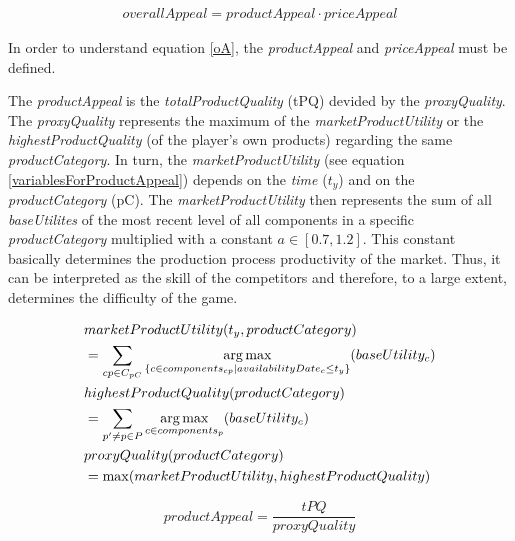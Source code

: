 \begin{equation}
\label{oA}
\begin{aligned}
overallAppeal = productAppeal \cdot priceAppeal
\end{aligned}
\end{equation}

In order to understand equation \ref{oA}, the \textit{productAppeal} and \textit{priceAppeal} must be defined.

The \textit{productAppeal} is the \textit{totalProductQuality} (tPQ) devided by the \textit{proxyQuality}.
The \textit{proxyQuality} represents the maximum of the \textit{marketProductUtility} or the \textit{highestProductQuality} (of the player's own products) regarding the same \textit{productCategory}.
In turn, the \textit{marketProductUtility} (see equation \ref{variablesForProductAppeal}) depends on the \textit{time} ($t_y$) and on the \textit{productCategory} (\gls{pC}). The \textit{marketProductUtility} then represents the sum of all \textit{baseUtilites} of the most recent level of all components in a specific \textit{productCategory} multiplied with a constant $a \in [0.7, 1.2]$. 
This constant basically determines the production process productivity of the market. Thus, it can be interpreted as the skill of the competitors and therefore, to a large extent, determines the difficulty of the game.

\begin{equation}
\label{variablesForProductAppeal}
\begin{aligned}
    & marketProductUtility(t_y, productCategory) \\
    & = \sum_{cp \in C_{pC}} \argmax\limits_{\{c \in components_{cp}| availabilityDate_c \leq t_y\}}(baseUtility_c)\\
    \newline
    & highestProductQuality(productCategory) \\
    & = \sum_{p' \neq p \in P} \argmax\limits_{c \in components_p}(baseUtility_c) \\
    \newline
    & proxyQuality(productCategory) \\
    & = \max(marketProductUtility, highestProductQuality)
\end{aligned}    
\end{equation}

\begin{equation}
    productAppeal = \dfrac{tPQ}{proxyQuality}
\end{equation}

